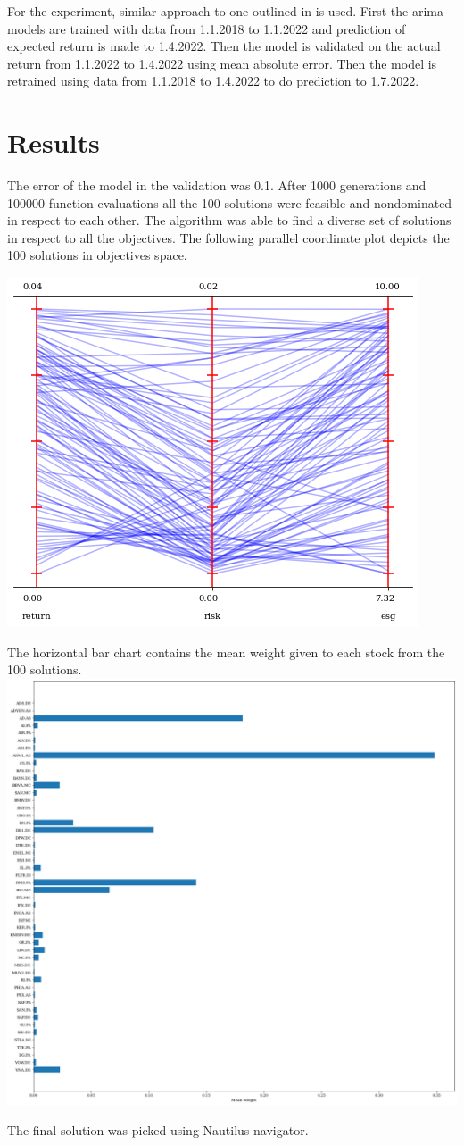 \documentclass[11pt]{article} %
\begin{document}
For the experiment, similar approach to one outlined in \cite{xidonas2018multiobjective} is used. First the arima models are trained with data from 1.1.2018 to 1.1.2022 and prediction of expected return is made to 1.4.2022. Then the model is validated on the actual return from 1.1.2022 to 1.4.2022 using mean absolute error. Then the model is retrained using data from 1.1.2018 to 1.4.2022 to do prediction to 1.7.2022.


\section{Results}

The error of the model in the validation was 0.1.
After 1000 generations and 100000 function evaluations all the 100 solutions were feasible and nondominated in respect to each other. The algorithm was able to find a diverse set of solutions in respect to all the objectives. The following parallel coordinate plot depicts the 100 solutions in objectives space. 

\includegraphics{pcpPlot}

The horizontal bar chart contains the mean weight given to each stock from the 100 solutions.
\hspace*{-1.5cm}
\includegraphics[scale=0.45]{meanW}

The final solution was picked using Nautilus navigator. 


\printbibliography %
\end{document}
